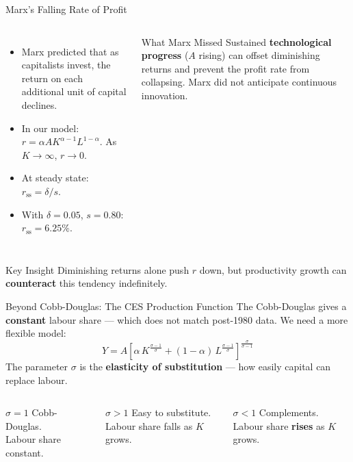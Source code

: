 \documentclass[aspectratio=169, 10pt]{beamer}
\begin{document}
\begin{frame}{Marx's Falling Rate of Profit}
\begin{columns}[T]
\begin{itemize}
  \item Marx predicted that as capitalists invest, the return on each
        additional unit of capital declines.
  \item In our model: $r = \alpha A K^{\alpha - 1} L^{1-\alpha}$.
        As $K \to \infty$, $r \to 0$.
  \item At steady state: $r_{\text{ss}} = \delta / s$.
  \item With $\delta = 0.05$, $s = 0.80$: $r_{\text{ss}} = 6.25\%$.
\end{itemize}
\begin{block}{What Marx Missed}
Sustained \textbf{technological progress} ($A$ rising) can offset
diminishing returns and prevent the profit rate from collapsing.
Marx did not anticipate continuous innovation.
\end{block}
\end{columns}
\vspace{0.5em}
\begin{alertblock}{Key Insight}
Diminishing returns alone push $r$ down, but productivity growth
can \textbf{counteract} this tendency indefinitely.
\end{alertblock}
\end{frame}

\begin{frame}{Beyond Cobb-Douglas: The CES Production Function}
The Cobb-Douglas gives a \textbf{constant} labour share --- which
does not match post-1980 data. We need a more flexible model:
\vspace{0.3em}
\[
  Y = A \left[\alpha\,K^{\frac{\sigma-1}{\sigma}}
    + (1-\alpha)\,L^{\frac{\sigma-1}{\sigma}}
  \right]^{\frac{\sigma}{\sigma-1}}
\]
\vspace{0.3em}
The parameter $\sigma$ is the \textbf{elasticity of substitution}
--- how easily capital can replace labour.
\vspace{0.5em}
\begin{columns}[T]
\begin{block}{$\sigma = 1$}
Cobb-Douglas.\\
Labour share constant.
\end{block}
\begin{block}{$\sigma > 1$}
Easy to substitute.\\
Labour share \alert{falls}
as $K$ grows.
\end{block}
\begin{block}{$\sigma < 1$}
Complements.\\
Labour share \textbf{rises}
as $K$ grows.
\end{block}
\end{columns}
\end{frame}
\end{document}
